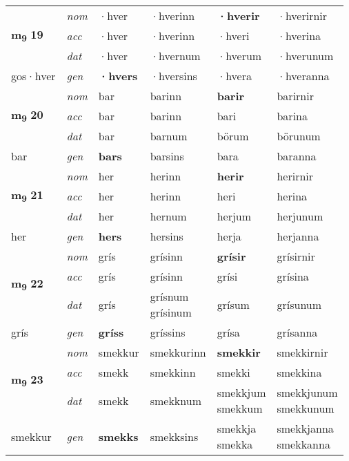 \begin{longtable}[l]{X>{\footnotesize\itshape}XXXXX}
\multirow{3}{*}{{{\textbf{m{\textsubscript{9}}} \Large{\textbf{19}}}}} & nom & ·hver & ·hverinn & \textbf{·hverir} & ·hverirnir \\*
 & acc & ·hver & ·hverinn & ·hveri & ·hverina \\*
 & dat & ·hver & ·hvernum & ·hverum & ·hverunum \\*
 {\footnotesize{gos\allowbreak ·hver}} & gen & \textbf{·hvers} & ·hversins & ·hvera & ·hveranna \\
\midrule

\multirow{3}{*}{{{\textbf{m{\textsubscript{9}}} \Large{\textbf{20}}}}} & nom & bar & barinn & \textbf{barir} & barirnir \\*
 & acc & bar & barinn & bari & barina \\*
 & dat & bar & barnum & börum & börunum \\*
 {\footnotesize{bar}} & gen & \textbf{bars} & barsins & bara & baranna \\
\midrule

\multirow{3}{*}{{{\textbf{m{\textsubscript{9}}} \Large{\textbf{21}}}}} & nom & her & herinn & \textbf{herir} & herirnir \\*
 & acc & her & herinn & heri & herina \\*
 & dat & her & hernum & herjum & herjunum \\*
 {\footnotesize{her}} & gen & \textbf{hers} & hersins & herja & herjanna \\
\midrule

\multirow{3}{*}{{{\textbf{m{\textsubscript{9}}} \Large{\textbf{22}}}}} & nom & grís & grísinn & \textbf{grísir} & grísirnir \\*
 & acc & grís & grísinn & grísi & grísina \\*
 & dat & grís & \specialcell{grísnum\\ grísinum} & grísum & grísunum \\*
 {\footnotesize{grís}} & gen & \textbf{gríss} & gríssins & grísa & grísanna \\
\midrule

\multirow{3}{*}{{{\textbf{m{\textsubscript{9}}} \Large{\textbf{23}}}}} & nom & smekkur & smekkurinn & \textbf{smekkir} & smekkirnir \\*
 & acc & smekk & smekkinn & smekki & smekkina \\*
 & dat & smekk & smekknum & \specialcell{smekkjum\\ smekkum} & \specialcell{smekkjunum\\ smekkunum} \\*
 {\footnotesize{smekkur}} & gen & \textbf{smekks} & smekksins & \specialcell{smekkja\\ smekka} & \specialcell{smekkjanna\\ smekkanna} \\
\midrule


\end{longtable}
